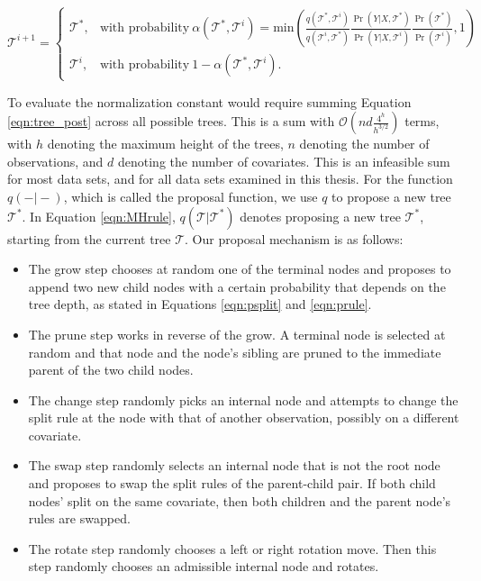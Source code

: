 \documentclass{article}
\begin{document}
\begin{equation}\label{eqn:MHrule}
\mathcal{T}^{i+1} =\begin{cases}
\mathcal{T}^*, & \text{with probability}\ \alpha(\mathcal{T}^*, \mathcal{T}^i) = \text{min}\left(\frac{q(\mathcal{T}^*, \mathcal{T}^i)}{q(\mathcal{T}^i, \mathcal{T}^*)}\frac{\Pr(Y\vert X, \mathcal{T}^*)}{\Pr(Y\vert X,\mathcal{T}^i)}\frac{\Pr(\mathcal{T}^{*})}{\Pr(\mathcal{T}^i)},1 \right) \\
\mathcal{T}^{i}, & \text{with probability}\ 1-\alpha(\mathcal{T}^*, \mathcal{T}^i).
\end{cases} \end{equation}

To evaluate the normalization constant would require summing Equation \ref{eqn:tree_post} across all possible trees. This is a sum with $\mathcal{O}(nd\frac{4^h}{h^{3/2}})$ terms, with $h$ denoting the maximum height of the trees, $n$ denoting the number of observations, and $d$ denoting the number of covariates. This is an infeasible sum for most data sets, and for all data sets examined in this thesis. For the function $q(-\vert-)$, which is called the proposal function, we use $q$ to propose a new tree $\mathcal{T}^*$.   
In Equation \ref{eqn:MHrule}, $q(\mathcal{T}\vert\mathcal{T}^*)$ denotes proposing a new tree $\mathcal{T}^*$, starting from the current tree $\mathcal{T}$. 
 Our proposal mechanism is as follows:
  \begin{itemize}
 \item The grow step chooses at random one of the terminal nodes and proposes to append two new child nodes with a certain probability that depends on the tree depth, as stated in Equations \ref{eqn:psplit} and \ref{eqn:prule}.
 \item The prune step works in reverse of the grow. A terminal node is selected at random and that node and the node's sibling are pruned to the immediate parent of the two child nodes.
 \item The change step randomly picks an internal node and attempts to change the split rule at the node with that of another observation, possibly on a different covariate.
  \item The swap step randomly selects an internal node that is not the root node and proposes to swap the split rules of the parent-child pair. If both child nodes' split on the same covariate, then both children and the parent node's rules are swapped.
  \item The rotate step randomly chooses a left or right rotation move. Then this step randomly chooses an admissible internal node and rotates.
 \end{itemize}
\end{document}

